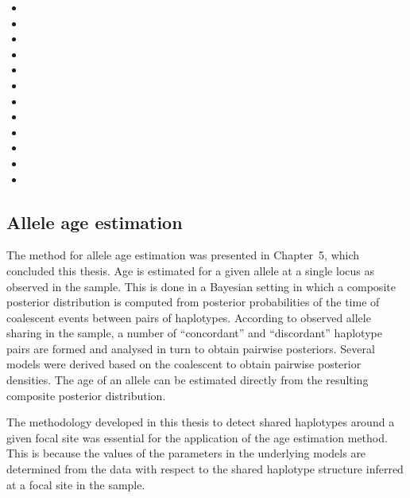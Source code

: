 \begin{itemize}
\item%

\item%

\item%

\item%

\item%

\item%

\item%

\item%

\item%

\item%

\item%

\item%

\end{itemize}




\subsection{Allele age estimation}


The method for allele age estimation was presented in Chapter~5, which concluded this thesis.
Age is estimated for a given allele at a single locus as observed in the sample.
This is done in a Bayesian setting in which a composite posterior distribution is computed from
posterior probabilities of the time of coalescent events between pairs of haplotypes.
According to observed allele sharing in the sample, a number of ``concordant'' and ``discordant'' haplotype pairs are formed and analysed in turn to obtain pairwise posteriors.
Several models were derived based on the coalescent to obtain pairwise posterior densities.
The age of an allele can be estimated directly from the resulting composite posterior distribution.

The methodology developed in this thesis to detect shared haplotypes around a given focal site was essential for the application of the age estimation method.
This is because the values of the parameters in the underlying models are determined from the data with respect to the shared haplotype structure inferred at a focal site in the sample.





